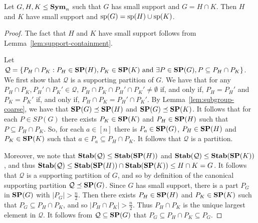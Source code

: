 \documentclass[../paper.tex]{subfiles}
\begin{document}
\begin{lem}
  Let $G, H, K \leq \text{\textbf{Sym}}_n$ such that $G$ has small support and $G = H \cap K$.
  Then $H$ and $K$ have small support and $\text{sp}(G) = \text{sp}(H) \cup
  \text{sp}(K)$.
  \label{lem:row-column-supports-well-behaved}
\end{lem}
\begin{proof}
The fact that $H$ and $K$ have small support follows from Lemma~\ref{lem:support-containment}.

  Let $\mathcal{Q} = \{P_H \cap P_K : P_H \in \text{\textbf{SP}}(H), P_K \in \text{\textbf{SP}}(K) \text{ and
  } \exists P \in \text{\textbf{SP}}(G), P \subseteq P_H \cap P_K \}$. We first show that
  $\mathcal{Q}$ is a supporting partition of $G$. We have that for any $P_H \cap
  P_K, P_H' \cap P_K' \in \mathcal{Q}$, $P_H \cap P_K \cap P_H' \cap P_K' \neq
  \emptyset$ if, and only if, $P_H = P_H'$ and $P_K = P_K'$ if, and only if,
  $P_H \cap P_K = P_H' \cap P_K'$.  By
  Lemma~\ref{lem:subgroup-coarse}, we have that $\text{\textbf{SP}}(G) \preceq
  \text{\textbf{SP}}(H)$ and $\text{\textbf{SP}}(G) \preceq \text{\textbf{SP}}(K)$. It follows that for each $P \in SP(G)$ there exists $P_K \in \text{\textbf{SP}}(K)$ and $P_H \in
  \text{\textbf{SP}}(H)$ such that $P \subseteq P_H \cap P_K$.  So, for each $a \in [n]$ there is
  $P_a \in \text{\textbf{SP}}(G)$, $P_H \in \text{\textbf{SP}}(H)$ and $P_K \in \text{\textbf{SP}}(K)$ such that $a \in P_a
  \subseteq P_H \cap P_K$. It follows that $\mathcal{Q}$ is a partition.

  Moreover, we note that $\text{\textbf{Stab}}(\mathcal{Q}) \leq \text{\textbf{Stab}}(\text{\textbf{SP}}(H))$ and
  $\text{\textbf{Stab}}(\mathcal{Q}) \leq \text{\textbf{Stab}}(\text{\textbf{SP}}(K))$, and thus $\text{\textbf{Stab}}(\mathcal{Q})
  \leq \text{\textbf{Stab}}(\text{\textbf{SP}}(H)) \cap \text{\textbf{Stab}}(\text{\textbf{SP}}(K)) \leq H \cap K = G$. It follows
  that $\mathcal{Q}$ is a supporting partition of $G$, and so by definition of
  the canonical supporting partition $\mathcal{Q} \preceq \text{\textbf{SP}} (G)$.
  Since $G$ has small support, there is a part $P_G$ in $\text{\textbf{SP}}(G)$ with
  $|P_G| > \frac{n}{2}$. Then there exists $P_H \in \text{\textbf{SP}}(H)$ and
  $P_K \in \text{\textbf{SP}}(K)$ such that $P_G \subseteq P_H \cap P_K$, and so $\vert P_H \cap P_K
  \vert > \frac{n}{2}$. Thus $P_H \cap P_K$ is the unique largest
  element in $\mathcal{Q}$.   It follows from $\mathcal{Q} \subseteq \text{\textbf{SP}}(G)$
  that $P_G \subseteq P_H \cap P_K \subseteq P_G$.



\end{proof}
\end{document}
